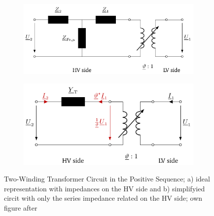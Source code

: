\begin{figure}%
    \centering
    \begin{subfigure}[c]{.53\textwidth}
        \centering
        \includegraphics[width=\linewidth]{tikz_graphics/images/transformer_complete.pdf}
    \end{subfigure}
    \begin{subfigure}[c]{.46\textwidth}
        \centering
        \includegraphics[width=\linewidth]{tikz_graphics/images/transformer_reduced.pdf}
    \end{subfigure}
    \caption[Two-Winding Transformer Circuit in the Positive Sequence]{Two-Winding Transformer Circuit in the Positive Sequence; a) ideal representation with impedances on the \acs{HV} side and b) simplifyied circit with only the series impedance related on the \acs{HV} side; own figure after \autocite{machowski_2020,kundur_2022,milano_2010}}
    \label{fig:trafo-model}
\end{figure}

